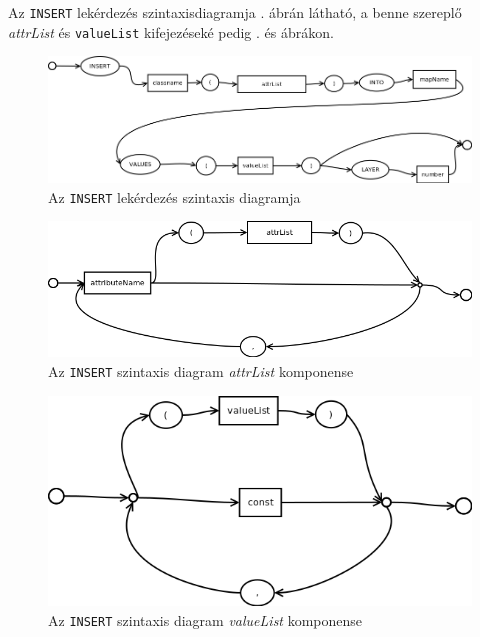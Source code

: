 Az \texttt{INSERT} lekérdezés szintaxisdiagramja . ábrán látható, a benne szereplő \textit{attrList} és \texttt{valueList} kifejezéseké pedig . és  ábrákon.

\begin{figure}[htb]
	\begin{center}
		\includegraphics[scale=0.4]{images/insert}
		\caption{Az \texttt{INSERT} lekérdezés szintaxis diagramja}
		\label{fig:insertSytnax}
	\end{center}
\end{figure}

\begin{figure}[htb]
	\begin{center}
		\includegraphics[scale=0.4]{images/attrList}
		\caption{Az \texttt{INSERT} szintaxis diagram \textit{attrList} komponense}
		\label{fig:attrListSytnax}
	\end{center}
\end{figure}

\begin{figure}[htb]
	\begin{center}
		\includegraphics[scale=0.4]{images/valueList}
		\caption{Az \texttt{INSERT} szintaxis diagram \textit{valueList} komponense}
		\label{fig:valueListSytnax}
	\end{center}
\end{figure}

